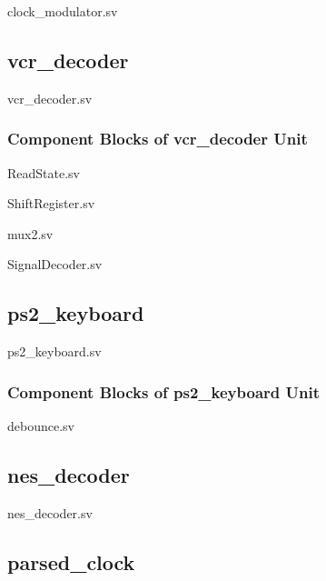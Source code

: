 \documentclass[a4paper]{article}
\begin{document}
clock\_modulator.sv


\clearpage

\subsection{vcr\_decoder}
vcr\_decoder.sv


\subsubsection{Component Blocks of vcr\_decoder Unit}
ReadState.sv


ShiftRegister.sv


mux2.sv


SignalDecoder.sv


\clearpage

\subsection{ps2\_keyboard}
ps2\_keyboard.sv


\subsubsection{Component Blocks of ps2\_keyboard Unit}
debounce.sv


\clearpage

\subsection{nes\_decoder}
nes\_decoder.sv


\subsection{parsed\_clock}
\end{document}
